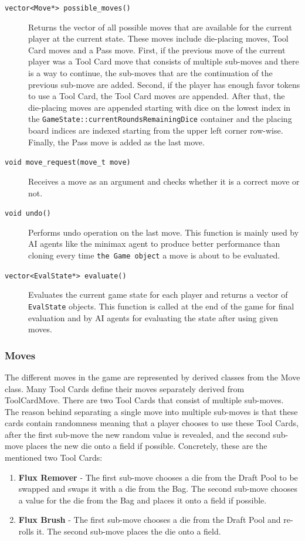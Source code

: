 \begin{description}
    \item[\texttt{vector<Move*> possible\_moves()}] \label{principle:possible_moves} Returns the vector of all possible moves that are available for the current player at the current state. These
    moves include die-placing moves, Tool Card moves and a Pass move. First, if the previous move of the current player was a Tool Card move that consists
    of multiple sub-moves and there is a way to continue, the sub-moves that are the continuation of the previous sub-move are added. Second, if the player
    has enough favor tokens to use a Tool Card, the Tool Card moves are appended. After that, the die-placing moves are appended starting with dice on the lowest
    index in the \texttt{GameState::currentRoundsRemainingDice} container and the placing board indices are indexed starting from the upper left corner row-wise.
    Finally, the Pass move is added as the last move.
    \item[\texttt{void move\_request(move\_t move)}] Receives a move as an argument and checks whether it is a correct move or not. 
    \item[\texttt{void undo()}] Performs undo operation on the last move. This function is mainly used by AI agents like the minimax agent to produce better 
    performance than cloning every time \texttt{the Game object} a move is about to be evaluated.
    \item[\texttt{vector<EvalState*> evaluate()}] Evaluates the current game state for each player and returns a vector of \texttt{EvalState} objects. This function is called
    at the end of the game for final evaluation and by AI agents for evaluating the state after using given moves. 
\end{description}



\subsubsection{Moves} \label{subsec:Move_Implementation}
The different moves in the game are represented by derived classes from the Move class. Many Tool Cards define their
moves separately derived from ToolCardMove. There are two Tool Cards that consist of multiple sub-moves. The reason behind separating a single move
into multiple sub-moves is that these cards contain randomness meaning that a player chooses to use these Tool Cards, after the first sub-move the new random
value is revealed, and the second sub-move places the new die onto a field if possible. Concretely, these are the mentioned two Tool Cards:
\begin{enumerate}
\item \textbf{Flux Remover} - The first sub-move chooses a die from the Draft Pool to be swapped and swaps it with a die from the Bag. The second
sub-move chooses a value for the die from the Bag and places it onto a field if possible.
\item \textbf{Flux Brush} - The first sub-move chooses a die from the Draft Pool and re-rolls it. The second sub-move places the die onto a field.
\end{enumerate}

